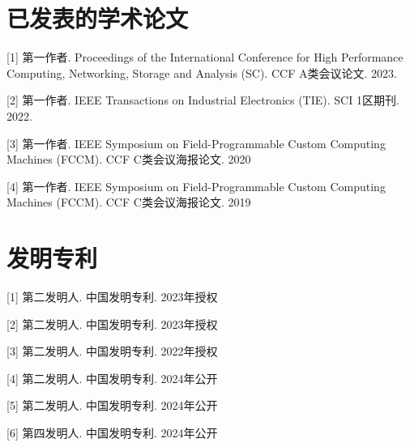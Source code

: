 \cleardoublepage
{}

\section*{已发表的学术论文}

[1] 第一作者. Proceedings of the International Conference for High Performance Computing,
Networking, Storage and Analysis (SC). CCF A类会议论文. 2023.

[2] 第一作者. IEEE Transactions on Industrial Electronics (TIE). SCI 1区期刊. 2022.

[3] 第一作者. IEEE Symposium on Field-Programmable Custom Computing Machines (FCCM). CCF C类会议海报论文. 2020

[4] 第一作者. IEEE Symposium on Field-Programmable Custom Computing Machines (FCCM). CCF C类会议海报论文. 2019

\section*{发明专利}

[1] 第二发明人. 中国发明专利. 2023年授权

[2] 第二发明人. 中国发明专利. 2023年授权

[3] 第二发明人. 中国发明专利. 2022年授权

[4] 第二发明人. 中国发明专利. 2024年公开

[5] 第二发明人. 中国发明专利. 2024年公开

[6] 第四发明人. 中国发明专利. 2024年公开





